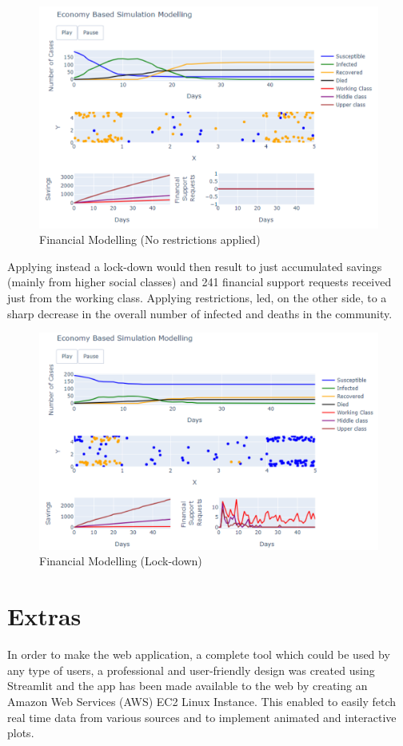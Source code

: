 \begin{figure}[ht!]%
    \centering
    \includegraphics[width=0.85\linewidth]{latex/images/fin1.pdf}
    \caption{Financial Modelling (No restrictions applied)}
    \label{fin1}
\end{figure}

Applying instead a lock-down would then result to just 
accumulated savings (mainly from higher social classes) and 241 financial support requests received just from the working class. Applying restrictions, led, on the other side, to a sharp decrease in the overall number of infected and deaths in the community.

\begin{figure}[ht!]%
    \centering
    \includegraphics[width=0.85\linewidth]{latex/images/fin2.pdf}
    \caption{Financial Modelling (Lock-down)}
    \label{fin2}
\end{figure}

\section{Extras}
In order to make the web application, a complete tool which could be used by any type of users, a professional and user-friendly design was created using Streamlit and the app has been made available to the web by creating an Amazon Web Services (AWS) EC2 Linux Instance. This enabled to easily fetch real time data from various sources and to implement animated and interactive plots.

